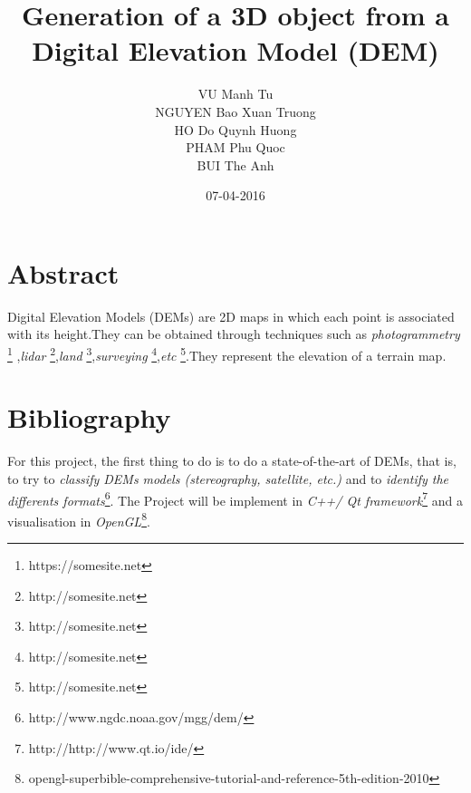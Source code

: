 \documentclass[11pt]{article}
\title{\textbf{Generation of a 3D object from a Digital Elevation Model (DEM)}}
\author{VU Manh Tu\\
		NGUYEN Bao Xuan Truong\\
		HO Do Quynh Huong\\
		PHAM Phu Quoc\\
		BUI The Anh
		}
\date{07-04-2016}
\begin{document}
\maketitle

\section{Abstract}

Digital Elevation Models (DEMs) are 2D maps in which each point is associated with its height.They can be obtained through techniques such as \emph{photogrammetry} \footnote{https://somesite.net} ,\emph{lidar} \footnote{http://somesite.net},\emph{land} \footnote{http://somesite.net},\emph{surveying} \footnote{http://somesite.net},\emph{etc} \footnote{http://somesite.net}.They represent the elevation of a terrain map. 

\section{Bibliography}

For this project, the first thing to do is to do a state-of-the-art of DEMs, that is, to try to \emph{classify DEMs models (stereography, satellite, etc.)} and to \emph{identify the differents formats}\footnote{http://www.ngdc.noaa.gov/mgg/dem/}.
The Project will be implement in \emph{C++/ Qt framework}\footnote{http://http://www.qt.io/ide/} and a visualisation in \emph{OpenGL}\footnote{opengl-superbible-comprehensive-tutorial-and-reference-5th-edition-2010}.
\end{document}
